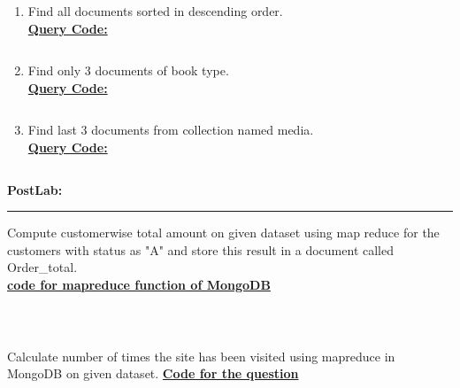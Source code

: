 \documentclass[11pt,article]{memoir}
\begin{document}
\begin{flushleft}
\begin{enumerate}
\begin{lstlisting}
\end{lstlisting}
\item Find all documents sorted in descending order.
\\
\textbf{\underline{Query Code:}}
\begin{lstlisting}

\end{lstlisting}
\item Find only 3 documents of book type.
\\
\textbf{\underline{Query Code:}}
\begin{lstlisting}

\end{lstlisting}
\item Find last 3 documents from collection named media.
\\
\textbf{\underline{Query Code:}}
\begin{lstlisting}

\end{lstlisting}
\end{enumerate}

\newpage
\textbf{PostLab:}\hrule
Compute customerwise total amount on given dataset using map reduce for the customers with status as "A" and store this result in a document called Order\_total.\\
\textbf{\underline{code for mapreduce function of MongoDB}}
\begin{lstlisting}

	
\end{lstlisting}
Calculate number of times the site has been visited using mapreduce in MongoDB on given dataset.
\textbf{\underline{Code for the question}}
\begin{lstlisting}

	
\end{lstlisting}
\newpage

\end{flushleft}
\end{document}
